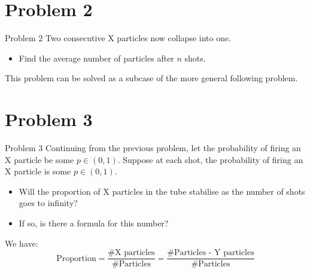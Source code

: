 \documentclass[xcolor={usenames,dvipsnames}]{beamer}
\begin{document}
\begin{comment}
  The formula represents the sum of each diagonal, which is made up of the sum of the previous two diagonals, satisfying the Fibonacci recursion. 

  Hence,   \[\sum_{k=0}^n \binom{n-k+1}{k} = F_{n+2}.\]
\end{multicols}

\end{frame}

\begin{frame}
  Since each of the $n$ particles is X or Y, the number of arrangements is $2^n$.

  Hence the probability that no two X-particles are consecutive after $n$ shots is \[
    \frac{F_{n+2}}{2^n}
  .\] 
\end{frame}
\end{comment}

\section{Problem 2}
\begin{frame}{Problem 2}
  Two consecutive X particles now collapse into one. 
  \begin{itemize}
    \item Find the average number of particles after $n$ shots.
  \end{itemize}

  This problem can be solved as a subcase of the more general following problem.
\end{frame}

\section{Problem 3}
\begin{frame}{Problem 3}
  Continuing from the previous problem, let the probability of firing an X particle be some  $p \in (0, 1)$.
  Suppose at each shot, the probability of firing an X particle is  some $p \in (0, 1)$.
  \begin{itemize}
    \item Will the proportion of X particles in the tube stabilise as the number of shots goes to infinity?
    \item If so, is there a formula for this number?
  \end{itemize}
  We have:
  \begin{equation*}
    \text{Proportion} = \frac{\#\text{X particles}}{\#\text{Particles}} = \frac{\#\text{Particles - Y particles}}{\#\text{Particles}}
  \end{equation*}
\end{frame}
\end{document}
